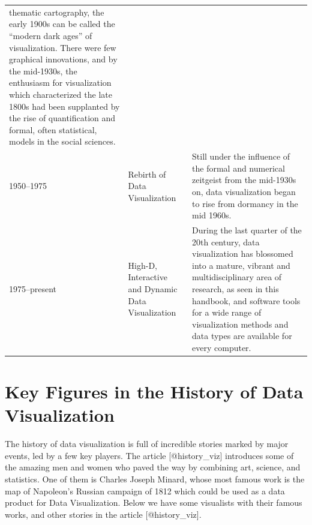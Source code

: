 \documentclass[]{book}
\theoremstyle{definition}
\theoremstyle{definition}
\theoremstyle{definition}
\theoremstyle{remark}
\begin{document}
\begin{longtable}[]{@{}lll@{}}
\begin{minipage}[t]{0.76\columnwidth}
thematic cartography, the early 1900s can be called the ``modern dark
ages'' of visualization. There were few graphical innovations, and by
the mid-1930s, the enthusiasm for visualization which characterized the
late 1800s had been supplanted by the rise of quantification and formal,
often statistical, models in the social sciences.\strut
\end{minipage}\tabularnewline
\begin{minipage}[t]{0.07\columnwidth}\raggedright\strut
1950--1975\strut
\end{minipage} & \begin{minipage}[t]{0.08\columnwidth}\raggedright\strut
Rebirth of Data Visualization\strut
\end{minipage} & \begin{minipage}[t]{0.76\columnwidth}\raggedright\strut
Still under the influence of the formal and numerical zeitgeist from the
mid-1930s on, data visualization began to rise from dormancy in the mid
1960s.\strut
\end{minipage}\tabularnewline
\begin{minipage}[t]{0.07\columnwidth}\raggedright\strut
1975--present\strut
\end{minipage} & \begin{minipage}[t]{0.08\columnwidth}\raggedright\strut
High-D, Interactive and Dynamic Data Visualization\strut
\end{minipage} & \begin{minipage}[t]{0.76\columnwidth}\raggedright\strut
During the last quarter of the 20th century, data visualization has
blossomed into a mature, vibrant and multidisciplinary area of research,
as seen in this handbook, and software tools for a wide range of
visualization methods and data types are available for every
computer.\strut
\end{minipage}\tabularnewline
\bottomrule
\end{longtable}

\section{Key Figures in the History of Data
Visualization}\label{key-figures-in-the-history-of-data-visualization}

The history of data visualization is full of incredible stories marked
by major events, led by a few key players. The article
{[}@history\_viz{]} introduces some of the amazing men and women who
paved the way by combining art, science, and statistics. One of them is
Charles Joseph Minard, whose most famous work is the map of Napoleon's
Russian campaign of 1812 which could be used as a data product for Data
Visualization. Below we have some visualists with their famous works,
and other stories in the article {[}@history\_viz{]}.
\end{document}
